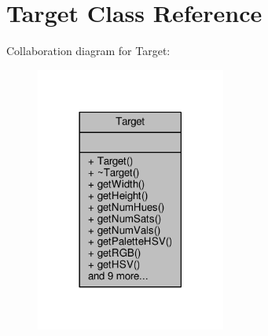 \hypertarget{classTarget}{}\section{Target Class Reference}
\label{classTarget}


Collaboration diagram for Target\+:
\nopagebreak
\begin{figure}[H]
\begin{center}
\leavevmode
\includegraphics[width=177pt]{classTarget__coll__graph}
\end{center}
\end{figure}
